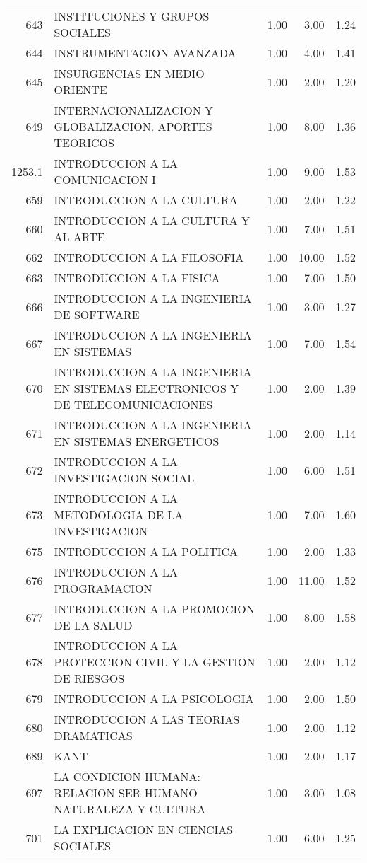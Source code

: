 \begin{table}[ht]
\begin{tabular}{rlrrr}
  643 & INSTITUCIONES Y GRUPOS SOCIALES & 1.00 & 3.00 & 1.24 \\ 
  644 & INSTRUMENTACION AVANZADA & 1.00 & 4.00 & 1.41 \\ 
  645 & INSURGENCIAS EN MEDIO ORIENTE & 1.00 & 2.00 & 1.20 \\ 
  649 & INTERNACIONALIZACION Y GLOBALIZACION. APORTES TEORICOS & 1.00 & 8.00 & 1.36 \\ 
  1253.1 & INTRODUCCION A LA COMUNICACION I & 1.00 & 9.00 & 1.53 \\ 
  659 & INTRODUCCION A LA CULTURA & 1.00 & 2.00 & 1.22 \\ 
  660 & INTRODUCCION A LA CULTURA Y AL ARTE & 1.00 & 7.00 & 1.51 \\ 
  662 & INTRODUCCION A LA FILOSOFIA & 1.00 & 10.00 & 1.52 \\ 
  663 & INTRODUCCION A LA FISICA & 1.00 & 7.00 & 1.50 \\ 
  666 & INTRODUCCION A LA INGENIERIA DE SOFTWARE & 1.00 & 3.00 & 1.27 \\ 
  667 & INTRODUCCION A LA INGENIERIA EN SISTEMAS & 1.00 & 7.00 & 1.54 \\ 
  670 & INTRODUCCION A LA INGENIERIA EN SISTEMAS ELECTRONICOS Y DE TELECOMUNICACIONES & 1.00 & 2.00 & 1.39 \\ 
  671 & INTRODUCCION A LA INGENIERIA EN SISTEMAS ENERGETICOS & 1.00 & 2.00 & 1.14 \\ 
  672 & INTRODUCCION A LA INVESTIGACION SOCIAL & 1.00 & 6.00 & 1.51 \\ 
  673 & INTRODUCCION A LA METODOLOGIA DE LA INVESTIGACION & 1.00 & 7.00 & 1.60 \\ 
  675 & INTRODUCCION A LA POLITICA & 1.00 & 2.00 & 1.33 \\ 
  676 & INTRODUCCION A LA PROGRAMACION & 1.00 & 11.00 & 1.52 \\ 
  677 & INTRODUCCION A LA PROMOCION DE LA SALUD & 1.00 & 8.00 & 1.58 \\ 
  678 & INTRODUCCION A LA PROTECCION CIVIL Y LA GESTION DE RIESGOS & 1.00 & 2.00 & 1.12 \\ 
  679 & INTRODUCCION A LA PSICOLOGIA & 1.00 & 2.00 & 1.50 \\ 
  680 & INTRODUCCION A LAS TEORIAS DRAMATICAS & 1.00 & 2.00 & 1.12 \\ 
  689 & KANT & 1.00 & 2.00 & 1.17 \\ 
  697 & LA CONDICION HUMANA: RELACION SER HUMANO NATURALEZA Y CULTURA & 1.00 & 3.00 & 1.08 \\ 
  701 & LA EXPLICACION EN CIENCIAS SOCIALES & 1.00 & 6.00 & 1.25 \\ 

\end{tabular}
\end{table}

